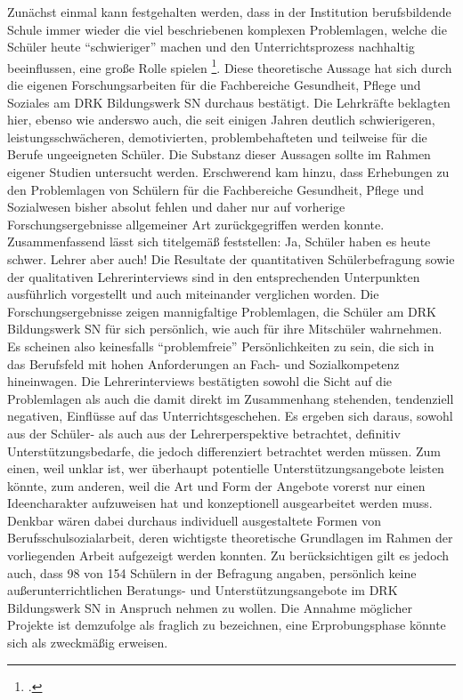 Zunächst einmal kann festgehalten werden, dass in der Institution berufsbildende Schule immer wieder die viel beschriebenen komplexen Problemlagen, welche die Schüler heute "`schwieriger"' machen und den Unterrichtsprozess nachhaltig beeinflussen, eine große Rolle spielen \footcite[vgl.][1]{UniversitaetLeipzig2007}. Diese theoretische Aussage hat sich durch die eigenen Forschungsarbeiten für die Fachbereiche Gesundheit, Pflege und Soziales am DRK Bildungswerk SN durchaus bestätigt. Die Lehrkräfte beklagten hier, ebenso wie anderswo auch, die seit einigen Jahren deutlich schwierigeren, leistungsschwächeren, demotivierten, problembehafteten und teilweise für die Berufe ungeeigneten Schüler. Die Substanz dieser Aussagen sollte im Rahmen eigener Studien untersucht werden. Erschwerend kam hinzu, dass Erhebungen zu den Problemlagen von Schülern für die Fachbereiche Gesundheit, Pflege und Sozialwesen bisher absolut fehlen und daher nur auf vorherige Forschungsergebnisse allgemeiner Art zurückgegriffen werden konnte. Zusammenfassend lässt sich titelgemäß feststellen: Ja, Schüler haben es heute schwer. Lehrer aber auch! Die Resultate der quantitativen Schülerbefragung sowie der qualitativen Lehrerinterviews sind in den entsprechenden Unterpunkten ausführlich vorgestellt und auch miteinander verglichen worden. Die Forschungsergebnisse zeigen mannigfaltige Problemlagen, die Schüler am DRK Bildungswerk SN für sich persönlich, wie auch für ihre Mitschüler wahrnehmen. Es scheinen also keinesfalls "`problemfreie"' Persönlichkeiten zu sein, die sich in das Berufsfeld mit hohen Anforderungen an Fach- und Sozialkompetenz hineinwagen. Die Lehrerinterviews bestätigten sowohl die Sicht auf die Problemlagen als auch die damit direkt im Zusammenhang stehenden, tendenziell negativen, Einflüsse auf das Unterrichtsgeschehen. Es ergeben sich daraus, sowohl aus der Schüler- als auch aus der Lehrerperspektive betrachtet, definitiv Unterstützungsbedarfe, die jedoch differenziert betrachtet werden müssen. Zum einen, weil unklar ist, wer überhaupt potentielle Unterstützungsangebote leisten könnte, zum anderen, weil die Art und Form der Angebote vorerst nur einen Ideencharakter aufzuweisen hat und konzeptionell ausgearbeitet werden muss. Denkbar wären dabei durchaus individuell ausgestaltete Formen von Berufsschulsozialarbeit, deren wichtigste theoretische Grundlagen im Rahmen der vorliegenden Arbeit aufgezeigt werden konnten. Zu berücksichtigen gilt es jedoch auch, dass 98 von 154 Schülern in der Befragung angaben, persönlich keine außerunterrichtlichen Beratungs- und Unterstützungsangebote im DRK Bildungswerk SN in Anspruch nehmen zu wollen. Die Annahme möglicher Projekte ist demzufolge als fraglich zu bezeichnen, eine Erprobungsphase könnte sich als zweckmäßig erweisen.
 
